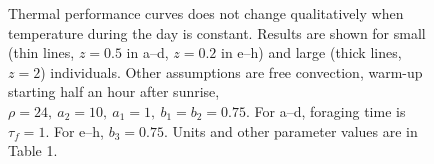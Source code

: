 \documentclass[11pt]{article}
\begin{document}
\begin{figure}
		\caption{
			\setstretch{\stretchby}
			Thermal performance curves does not change qualitatively when temperature during the day is constant.
			Results are shown for small (thin lines, $z = 0.5$ in a--d, $z = 0.2$ in e--h) and large (thick lines, $z = 2$) individuals.
			Other assumptions are free convection, warm-up starting half an hour after sunrise, $\rho = 24,\ a_2 = 10, \ a_1 = 1, \ b_1 = b_2 = 0.75 $.
	    For a--d, foraging time is $\tau_f = 1$.
	    For e--h, $b_3 = 0.75$.
	    Units and other parameter values are in Table 1.
		}
	\label{fig:therm}
\end{figure}


\end{document}
